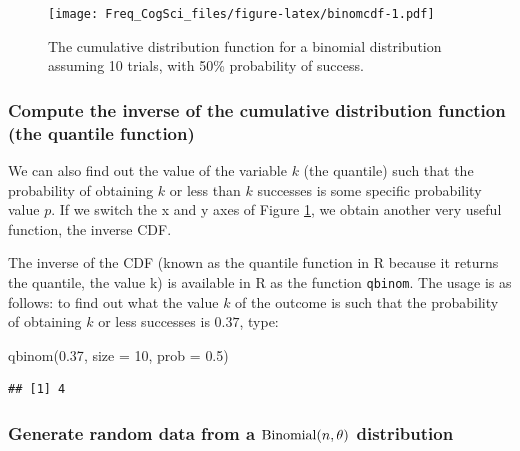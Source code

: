 \documentclass[
  12pt,
]{krantz}
\newenvironment{Shaded}{\begin{snugshade}}{\end{snugshade}}
\newcommand{\AttributeTok}[1]{\textcolor[rgb]{0.77,0.63,0.00}{#1}}
\newcommand{\DecValTok}[1]{\textcolor[rgb]{0.00,0.00,0.81}{#1}}
\newcommand{\FloatTok}[1]{\textcolor[rgb]{0.00,0.00,0.81}{#1}}
\newcommand{\FunctionTok}[1]{\textcolor[rgb]{0.00,0.00,0.00}{#1}}
\newcommand{\NormalTok}[1]{#1}
\theoremstyle{definition}
\theoremstyle{definition}
\theoremstyle{definition}
\theoremstyle{definition}
\theoremstyle{remark}
\begin{document}
\begin{figure}
\centering
\texttt{[image: Freq\_CogSci\_files/figure-latex/binomcdf-1.pdf]}
\caption{\label{fig:binomcdf}The cumulative distribution function for a binomial distribution assuming 10 trials, with 50\% probability of success.}
\end{figure}

\hypertarget{compute-the-inverse-of-the-cumulative-distribution-function-the-quantile-function}{%
\subsubsection{Compute the inverse of the cumulative distribution function (the quantile function)}\label{compute-the-inverse-of-the-cumulative-distribution-function-the-quantile-function}}

We can also find out the value of the variable \(k\) (the quantile) such that the probability of obtaining \(k\) or less than \(k\) successes is some specific probability value \(p\). If we switch the x and y axes of Figure \ref{fig:binomcdf}, we obtain another very useful function, the inverse CDF.

The inverse of the CDF (known as the quantile function in R because it returns the quantile, the value k) is available in R as the function \texttt{qbinom}. The usage is as follows: to find out what the value \(k\) of the outcome is such that the probability of obtaining \(k\) or less successes is \(0.37\), type:

\begin{Shaded}
\begin{Highlighting}[]
\FunctionTok{qbinom}\NormalTok{(}\FloatTok{0.37}\NormalTok{, }\AttributeTok{size =} \DecValTok{10}\NormalTok{, }\AttributeTok{prob =} \FloatTok{0.5}\NormalTok{)}
\end{Highlighting}
\end{Shaded}

\begin{verbatim}
## [1] 4
\end{verbatim}

\hypertarget{generate-random-data-from-a-hboxbinomialntheta-distribution}{%
\subsubsection{\texorpdfstring{Generate random data from a \(\hbox{Binomial}(n,\theta)\) distribution}{Generate random data from a \textbackslash hbox\{Binomial\}(n,\textbackslash theta) distribution}}\label{generate-random-data-from-a-hboxbinomialntheta-distribution}}
\end{document}
